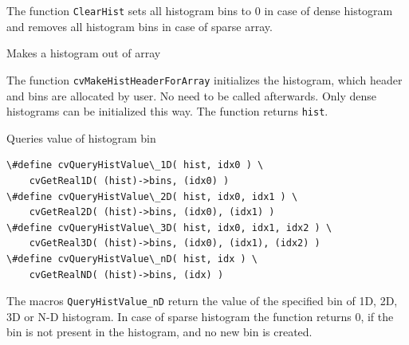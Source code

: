 The function \texttt{ClearHist} sets all histogram bins to 0 in case of dense histogram and removes all histogram bins in case of sparse array.

\label{MakeHistHeaderForArray}

Makes a histogram out of array


\begin{description}
\end{description}

The function \texttt{cvMakeHistHeaderForArray} initializes the histogram, which header and bins are allocated by user. No  need to be called afterwards. Only dense histograms can be initialized this way. The function returns \texttt{hist}.

\label{QueryHistValue_nD}

Queries value of histogram bin

\begin{lstlisting}
\#define cvQueryHistValue\_1D( hist, idx0 ) \
    cvGetReal1D( (hist)->bins, (idx0) )
\#define cvQueryHistValue\_2D( hist, idx0, idx1 ) \
    cvGetReal2D( (hist)->bins, (idx0), (idx1) )
\#define cvQueryHistValue\_3D( hist, idx0, idx1, idx2 ) \
    cvGetReal3D( (hist)->bins, (idx0), (idx1), (idx2) )
\#define cvQueryHistValue\_nD( hist, idx ) \
    cvGetRealND( (hist)->bins, (idx) )
\end{lstlisting}

\begin{description}
\cvarg{hist}{Histogram}
\end{description}

The macros \texttt{QueryHistValue\_nD} return the value of the specified bin of 1D, 2D, 3D or N-D histogram. In case of sparse histogram the function returns 0, if the bin is not present in the histogram, and no new bin is created.

